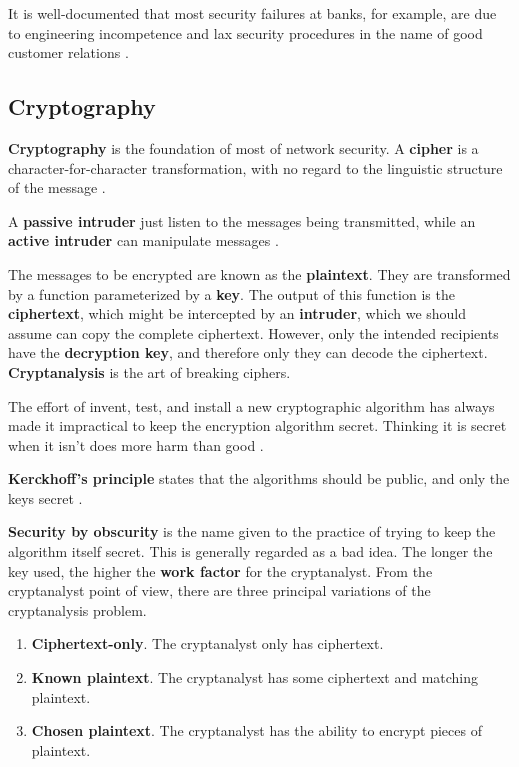 It is well-documented that most security failures at banks, for example, are due to engineering incompetence and lax security procedures in the name of good customer relations \cite[p.~765]{computer-networks-tanenbaum-2012}.

\subsection{Cryptography}

\textbf{Cryptography} is the foundation of most of network security.
A \textbf{cipher} is a character-for-character transformation, with no regard to the linguistic structure of the message \cite[p.~766]{computer-networks-tanenbaum-2012}.

A \textbf{passive intruder} just listen to the messages being transmitted, while an \textbf{active intruder} can manipulate messages \cite[p.~767]{computer-networks-tanenbaum-2012}.

The messages to be encrypted are known as the \textbf{plaintext}. They are transformed by a function parameterized by a \textbf{key}.
The output of this function is the \textbf{ciphertext}, which might be intercepted by an \textbf{intruder}, which we should assume can copy the complete ciphertext.
However, only the intended recipients have the \textbf{decryption key}, and therefore only they can decode the ciphertext.
\textbf{Cryptanalysis} is the art of breaking ciphers.

The effort of invent, test, and install a new cryptographic algorithm has always made it impractical to keep the encryption algorithm secret.
Thinking it is secret when it isn't does more harm than good \cite[p.~768]{computer-networks-tanenbaum-2012}.

\textbf{Kerckhoff's principle} states that the algorithms should be public, and only the keys secret \cite[p.~768]{computer-networks-tanenbaum-2012}.

\textbf{Security by obscurity} is the name given to the practice of trying to keep the algorithm itself secret.
This is generally regarded as a bad idea. The longer the key used, the higher the \textbf{work factor} for the cryptanalyst.
From the cryptanalyst point of view, there are three principal variations of the cryptanalysis problem.

\begin{enumerate}
    \item \textbf{Ciphertext-only}. The cryptanalyst only has ciphertext.
    \item \textbf{Known plaintext}. The cryptanalyst has some ciphertext and matching plaintext.
    \item \textbf{Chosen plaintext}. The cryptanalyst has the ability to encrypt pieces of plaintext.
\end{enumerate}


